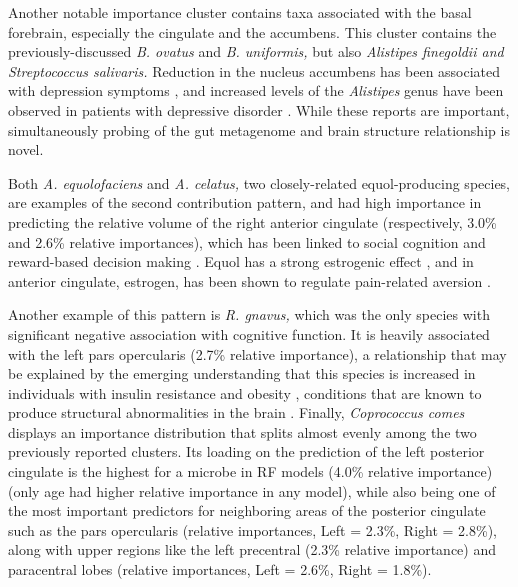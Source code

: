\documentclass{article}
\begin{document}
Another notable importance cluster contains taxa associated with the
basal forebrain, especially the cingulate and the accumbens. This
cluster contains the previously-discussed \emph{B. ovatus} and \emph{B.
uniformis,} but also \emph{Alistipes finegoldii and Streptococcus
salivaris.} Reduction in the nucleus accumbens has been associated with
depression symptoms
\cite{wackerRoleNucleusAccumbens2009},
and increased levels of the \emph{Alistipes} genus have been
observed in patients with depressive disorder
\cite{jiangAlteredFecalMicrobiota2015}.
While these reports are important, simultaneously probing of the gut
metagenome and brain structure relationship is novel.

Both \emph{A. equolofaciens} and \emph{A. celatus,} two closely-related
equol-producing species, are examples of the second contribution
pattern, and had high importance in predicting the relative volume of
the right anterior cingulate (respectively, 3.0\% and 2.6\% relative
importances), which has been linked to social cognition and reward-based
decision making
\cite{appsAnteriorCingulateGyrus2016,boesRightAnteriorCingulate2008,bushDorsalAnteriorCingulate2002}.
Equol has a strong estrogenic effect
\cite{setchellSEquolPotentLigand2005},
and in anterior cingulate, estrogen, has been shown to regulate
pain-related aversion
\cite{xiaoEstrogenAnteriorCingulate2013}.

Another example of this pattern is \emph{R. gnavus,} which was the only
species with significant negative association with cognitive function.
It is heavily associated with the left pars opercularis (2.7\% relative
importance), a relationship that may be explained by the emerging
understanding that this species is increased in individuals with insulin
resistance and obesity \cite{leyHumanGutMicrobes2006},
conditions that are known to produce structural abnormalities in the brain
\cite{opelBrainStructuralAbnormalities2021}.
Finally, \emph{Coprococcus comes} displays an importance
distribution that splits almost evenly among the two previously reported
clusters. Its loading on the prediction of the left posterior cingulate
is the highest for a microbe in RF models (4.0\% relative importance)
(only age had higher relative importance in any model), while also being
one of the most important predictors for neighboring areas of the
posterior cingulate such as the pars opercularis (relative importances,
Left = 2.3\%, Right = 2.8\%), along with upper regions like the left
precentral (2.3\% relative importance) and paracentral lobes (relative
importances, Left = 2.6\%, Right = 1.8\%).
\end{document}
